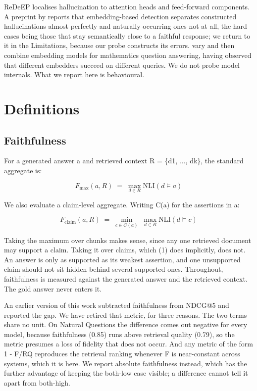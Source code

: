\documentclass[11pt]{article}
\begin{document}
ReDeEP \citep{sun-etal-2025} localises hallucination to attention heads and feed-forward components. A preprint by \citet{sinha-2025} reports that embedding-based detection separates constructed hallucinations almost perfectly and naturally occurring ones not at all, the hard cases being those that stay semantically close to a faithful response; we return to it in the Limitations, because our probe constructs its errors. \citet{chen-etal-2025} vary and then combine embedding models for mathematics question answering, having observed that different embedders succeed on different queries. We do not probe model internals. What we report here is behavioural.


\section{Definitions}
\label{sec:defs}


\subsection{Faithfulness}
\label{sec:def-faith}

For a generated answer a and retrieved context R = \{d1, ..., dk\}, the standard aggregate is:

\begin{equation}
F_{\max}(a, R) \;=\; \max_{d \in R} \mathrm{NLI}(d \models a)
\end{equation}

We also evaluate a claim-level aggregate. Writing C(a) for the assertions in a:

\begin{equation}
F_{\mathrm{claim}}(a, R) \;=\; \min_{c \in C(a)} \; \max_{d \in R} \mathrm{NLI}(d \models c)
\end{equation}

Taking the maximum over chunks makes sense, since any one retrieved document may support a claim. Taking it over claims, which (1) does implicitly, does not. An answer is only as supported as its weakest assertion, and one unsupported claim should not sit hidden behind several supported ones. Throughout, faithfulness is measured against the generated answer and the retrieved context. The gold answer never enters it.

An earlier version of this work subtracted faithfulness from NDCG@5 and reported the gap. We have retired that metric, for three reasons. The two terms share no unit. On Natural Questions the difference comes out negative for every model, because faithfulness (0.85) runs above retrieval quality (0.79), so the metric presumes a loss of fidelity that does not occur. And any metric of the form 1 - F/RQ reproduces the retrieval ranking whenever F is near-constant across systems, which it is here. We report absolute faithfulness instead, which has the further advantage of keeping the both-low case visible; a difference cannot tell it apart from both-high.
\end{document}
